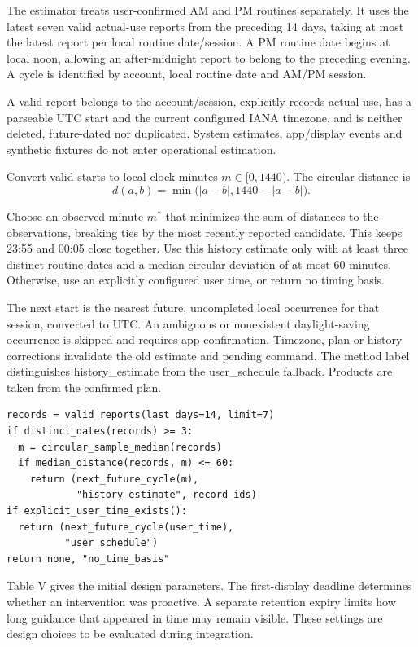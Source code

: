 \documentclass[conference,letterpaper]{IEEEtran}
\begin{document}
The estimator treats user-confirmed AM and PM routines separately. It uses the latest seven valid actual-use reports from the preceding 14 days, taking at most the latest report per local routine date/session. A PM routine date begins at local noon, allowing an after-midnight report to belong to the preceding evening. A cycle is identified by account, local routine date and AM/PM session.

A valid report belongs to the account/session, explicitly records actual use, has a parseable UTC start and the current configured IANA timezone, and is neither deleted, future-dated nor duplicated. System estimates, app/display events and synthetic fixtures do not enter operational estimation.

Convert valid starts to local clock minutes $m\in[0,1440)$. The circular distance is \begin{equation}
d(a,b)=\min\bigl(|a-b|,1440-|a-b|\bigr).
\end{equation}

Choose an observed minute $m^*$ that minimizes the sum of distances to the observations, breaking ties by the most recently reported candidate. This keeps 23:55 and 00:05 close together. Use this history estimate only with at least three distinct routine dates and a median circular deviation of at most 60 minutes. Otherwise, use an explicitly configured user time, or return no timing basis.

The next start is the nearest future, uncompleted local occurrence for that session, converted to UTC. An ambiguous or nonexistent daylight-saving occurrence is skipped and requires app confirmation. Timezone, plan or history corrections invalidate the old estimate and pending command. The method label distinguishes history\_estimate from the user\_schedule fallback. Products are taken from the confirmed plan.

\begin{lstlisting}
records = valid_reports(last_days=14, limit=7)
if distinct_dates(records) >= 3:
  m = circular_sample_median(records)
  if median_distance(records, m) <= 60:
    return (next_future_cycle(m),
            "history_estimate", record_ids)
if explicit_user_time_exists():
  return (next_future_cycle(user_time),
          "user_schedule")
return none, "no_time_basis"
\end{lstlisting}

Table V gives the initial design parameters. The first-display deadline determines whether an intervention was proactive. A separate retention expiry limits how long guidance that appeared in time may remain visible. These settings are design choices to be evaluated during integration.
\end{document}
